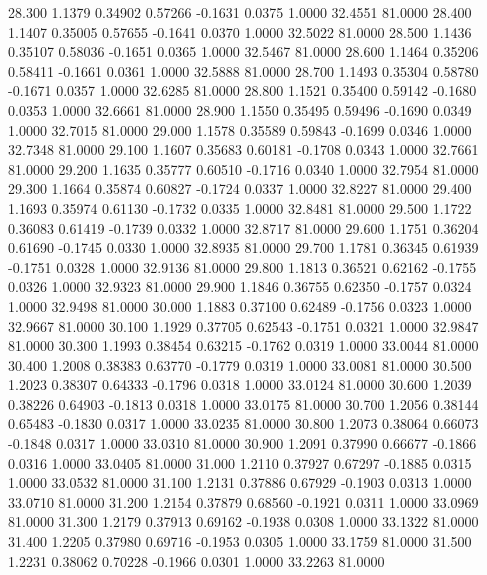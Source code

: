   28.300   1.1379   0.34902   0.57266  -0.1631   0.0375   1.0000  32.4551  81.0000
  28.400   1.1407   0.35005   0.57655  -0.1641   0.0370   1.0000  32.5022  81.0000
  28.500   1.1436   0.35107   0.58036  -0.1651   0.0365   1.0000  32.5467  81.0000
  28.600   1.1464   0.35206   0.58411  -0.1661   0.0361   1.0000  32.5888  81.0000
  28.700   1.1493   0.35304   0.58780  -0.1671   0.0357   1.0000  32.6285  81.0000
  28.800   1.1521   0.35400   0.59142  -0.1680   0.0353   1.0000  32.6661  81.0000
  28.900   1.1550   0.35495   0.59496  -0.1690   0.0349   1.0000  32.7015  81.0000
  29.000   1.1578   0.35589   0.59843  -0.1699   0.0346   1.0000  32.7348  81.0000
  29.100   1.1607   0.35683   0.60181  -0.1708   0.0343   1.0000  32.7661  81.0000
  29.200   1.1635   0.35777   0.60510  -0.1716   0.0340   1.0000  32.7954  81.0000
  29.300   1.1664   0.35874   0.60827  -0.1724   0.0337   1.0000  32.8227  81.0000
  29.400   1.1693   0.35974   0.61130  -0.1732   0.0335   1.0000  32.8481  81.0000
  29.500   1.1722   0.36083   0.61419  -0.1739   0.0332   1.0000  32.8717  81.0000
  29.600   1.1751   0.36204   0.61690  -0.1745   0.0330   1.0000  32.8935  81.0000
  29.700   1.1781   0.36345   0.61939  -0.1751   0.0328   1.0000  32.9136  81.0000
  29.800   1.1813   0.36521   0.62162  -0.1755   0.0326   1.0000  32.9323  81.0000
  29.900   1.1846   0.36755   0.62350  -0.1757   0.0324   1.0000  32.9498  81.0000
  30.000   1.1883   0.37100   0.62489  -0.1756   0.0323   1.0000  32.9667  81.0000
  30.100   1.1929   0.37705   0.62543  -0.1751   0.0321   1.0000  32.9847  81.0000
  30.300   1.1993   0.38454   0.63215  -0.1762   0.0319   1.0000  33.0044  81.0000
  30.400   1.2008   0.38383   0.63770  -0.1779   0.0319   1.0000  33.0081  81.0000
  30.500   1.2023   0.38307   0.64333  -0.1796   0.0318   1.0000  33.0124  81.0000
  30.600   1.2039   0.38226   0.64903  -0.1813   0.0318   1.0000  33.0175  81.0000
  30.700   1.2056   0.38144   0.65483  -0.1830   0.0317   1.0000  33.0235  81.0000
  30.800   1.2073   0.38064   0.66073  -0.1848   0.0317   1.0000  33.0310  81.0000
  30.900   1.2091   0.37990   0.66677  -0.1866   0.0316   1.0000  33.0405  81.0000
  31.000   1.2110   0.37927   0.67297  -0.1885   0.0315   1.0000  33.0532  81.0000
  31.100   1.2131   0.37886   0.67929  -0.1903   0.0313   1.0000  33.0710  81.0000
  31.200   1.2154   0.37879   0.68560  -0.1921   0.0311   1.0000  33.0969  81.0000
  31.300   1.2179   0.37913   0.69162  -0.1938   0.0308   1.0000  33.1322  81.0000
  31.400   1.2205   0.37980   0.69716  -0.1953   0.0305   1.0000  33.1759  81.0000
  31.500   1.2231   0.38062   0.70228  -0.1966   0.0301   1.0000  33.2263  81.0000
